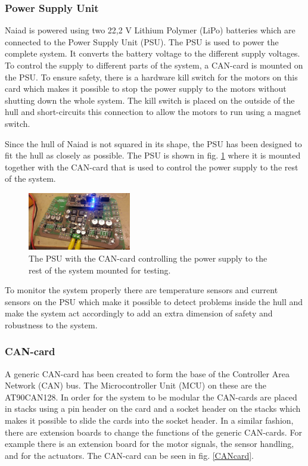 \documentclass[twoside,12pt]{article}
\begin{document}
\begin{multicols*}{2}
\subsubsection{Power Supply Unit}
Naiad is powered using two 22,2 V Lithium Polymer (LiPo) batteries which are connected to the Power Supply Unit (PSU). The PSU is used to power the complete system. It converts the battery voltage to the different supply voltages. To control the supply to different parts of the system, a CAN-card is mounted on the PSU. To ensure safety, there is a hardware kill switch for the motors on this card which makes it possible to stop the power supply to the motors without shutting down the whole system. The kill switch is placed on the outside of the hull and short-circuits this connection to allow the motors to run using a magnet switch. 

Since the hull of Naiad is not squared in its shape, the PSU has been designed to fit the hull as closely as possible. The PSU is shown in fig. \ref{PSUcard} where it is mounted together with the CAN-card that is used to control the power supply to the rest of the system. 
\begin{figure}[H]
\begin{center}
\includegraphics[width=0.4\textwidth]{./images/PSU.jpg}
\caption{The PSU with the CAN-card controlling the power supply to the rest of the system mounted for testing.}
\label{PSUcard}
\end{center}
\end{figure}
To monitor the system properly there are temperature sensors and current sensors on the PSU which make it possible to detect problems inside the hull and make the system act accordingly to add an extra dimension of safety and robustness to the system. 
\subsubsection{CAN-card}
A generic CAN-card has been created to form the base of the Controller Area Network (CAN) bus. The Microcontroller Unit (MCU) on these are the AT90CAN128. In order for the system to be modular the CAN-cards are placed in stacks using a pin header on the card and a socket header on the stacks which makes it possible to slide the cards into the socket header. In a similar fashion, there are extension boards to change the functions of the generic CAN-cards. For example there is an extension board for the motor signals, the sensor handling, and for the actuators. The CAN-card can be seen in fig. \ref{CANcard}.


\end{multicols*}
\end{document}
